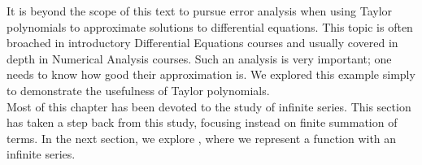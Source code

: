 It is beyond the scope of this text to pursue error analysis when using Taylor polynomials to approximate solutions to differential equations. This topic is often broached in introductory Differential Equations courses and usually covered in depth in Numerical Analysis courses. Such an analysis is very important; one needs to know how good their approximation is. We explored this example simply to demonstrate the usefulness of Taylor polynomials. \\

Most of this chapter has been devoted to the study of infinite series. This section has taken a step back from this study, focusing instead on finite summation of terms. In the next section, we explore , where we represent a function with an infinite series.



